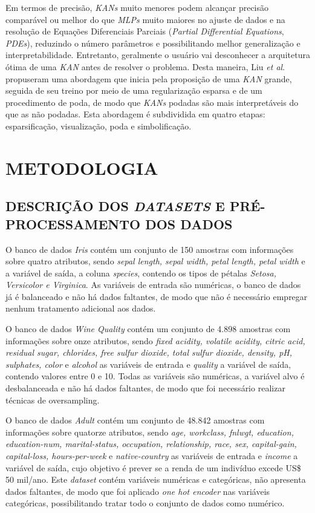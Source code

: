 \documentclass[journal]{IEEEtran}
\begin{document}
Em termos de precisão, \textit{KANs} muito menores podem alcançar precisão comparável ou melhor do que \textit{MLPs} muito maiores no ajuste de dados e na resolução de Equações Diferenciais Parciais (\textit{Partial Differential Equations}, \textit{PDEs}), reduzindo o número parâmetros e possibilitando melhor generalização e interpretabilidade. Entretanto, geralmente o usuário vai desconhecer a arquitetura ótima de uma \textit{KAN} antes de resolver o problema. Desta maneira, Liu \textit{et al}. \cite{liu} propuseram uma abordagem que inicia pela proposição de uma \textit{KAN} grande, seguida de seu treino por meio de uma regularização esparsa e de um procedimento de poda, de modo que \textit{KANs} podadas são mais interpretáveis do que as não podadas. Esta abordagem é subdividida em quatro etapas: esparsificação, visualização, poda e simbolificação.

\section{METODOLOGIA}
\subsection{DESCRIÇÃO DOS \textit{DATASETS} E PRÉ-PROCESSAMENTO DOS DADOS}

O banco de dados \textit{Iris} contém um conjunto de 150 amostras com informações sobre quatro atributos, sendo \textit{sepal length, sepal width, petal length, petal width} e a variável de saída, a coluna \textit{species}, contendo os tipos de pétalas \textit{Setosa, Versicolor e Virginica}. As variáveis de entrada são numéricas, o banco de dados já é balanceado e não há dados faltantes, de modo que não é necessário empregar nenhum tratamento adicional aos dados.

O banco de dados \textit{Wine Quality} contém um conjunto de 4.898 amostras com informações sobre onze atributos, sendo \textit{fixed acidity, volatile acidity, citric acid, residual sugar, chlorides, free sulfur dioxide, total sulfur dioxide, density, pH, sulphates, color} e \textit{alcohol} as variáveis de entrada e \textit{quality} a variável de saída, contendo valores entre 0 e 10. Todas as variáveis são numéricas, a variável alvo é desbalanceada e não há dados faltantes, de modo que foi necessário realizar técnicas de oversampling.

O banco de dados \textit{Adult} contém um conjunto de 48.842 amostras com informações sobre quatorze atributos, sendo \textit{age, workclass, fnlwgt, education, education-num, marital-status, occupation, relationship, race, sex, capital-gain, capital-loss, hours-per-week} e \textit{native-country} as variáveis de entrada e \textit{income} a variável de saída, cujo objetivo é prever se a renda de um indivíduo excede US\$ 50 mil/ano. Este \textit{dataset} contém variáveis numéricas e categóricas, não apresenta dados faltantes, de modo que foi aplicado \textit{one hot encoder} nas variáveis categóricas, possibilitando tratar todo o conjunto de dados como numérico.
\end{document}
